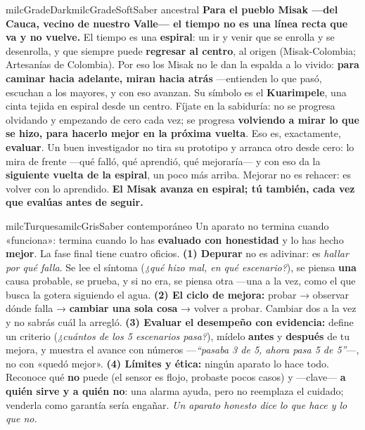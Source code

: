\documentclass[11pt,letterpaper]{article}
\begin{document}
\begin{softbox}{milcGradeDark}{milcGradeSoft}{Saber ancestral}
\textbf{Para el pueblo Misak ---del Cauca, vecino de nuestro Valle--- el tiempo no es una línea recta que va y no vuelve.} El tiempo es una \textbf{espiral}: un ir y venir que se enrolla y se desenrolla, y que siempre puede \textbf{regresar al centro}, al origen (Misak-Colombia; Artesanías de Colombia). Por eso los Misak no le dan la espalda a lo vivido: \textbf{para caminar hacia adelante, miran hacia atrás} ---entienden lo que pasó, escuchan a los mayores, y con eso avanzan. Su símbolo es el \textbf{Kuarimpele}, una cinta tejida en espiral desde un centro. Fíjate en la sabiduría: no se progresa olvidando y empezando de cero cada vez; se progresa \textbf{volviendo a mirar lo que se hizo, para hacerlo mejor en la próxima vuelta}. Eso es, exactamente, \textbf{evaluar}. Un buen investigador no tira su prototipo y arranca otro desde cero: lo mira de frente ---qué falló, qué aprendió, qué mejoraría--- y con eso da la \textbf{siguiente vuelta de la espiral}, un poco más arriba. Mejorar no es rehacer: es volver con lo aprendido. \textbf{El Misak avanza en espiral; tú también, cada vez que evalúas antes de seguir.}
\end{softbox}

\begin{softbox}{milcTurquesa}{milcGris}{Saber contemporáneo}
Un aparato no termina cuando «funciona»: termina cuando lo has \textbf{evaluado con honestidad} y lo has hecho \textbf{mejor}. La fase final tiene cuatro oficios. \textbf{(1) Depurar} no es adivinar: es \emph{hallar por qué falla}. Se lee el síntoma (\emph{¿qué hizo mal, en qué escenario?}), se piensa \textbf{una} causa probable, se prueba, y si no era, se piensa otra ---una a la vez, como el que busca la gotera siguiendo el agua. \textbf{(2) El ciclo de mejora:} probar → observar dónde falla → \textbf{cambiar una sola cosa} → volver a probar. Cambiar dos a la vez y no sabrás cuál la arregló. \textbf{(3) Evaluar el desempeño con evidencia:} define un criterio (\emph{¿cuántos de los 5 escenarios pasa?}), mídelo \textbf{antes} y \textbf{después} de tu mejora, y muestra el avance con números ---\emph{``pasaba 3 de 5, ahora pasa 5 de 5''}---, no con «quedó mejor». \textbf{(4) Límites y ética:} ningún aparato lo hace todo. Reconoce qué \textbf{no} puede (el sensor es flojo, probaste pocos casos) y ---clave--- \textbf{a quién sirve y a quién no}: una alarma ayuda, pero no reemplaza el cuidado; venderla como garantía sería engañar. \emph{Un aparato honesto dice lo que hace y lo que no.}
\end{softbox}
\end{document}
